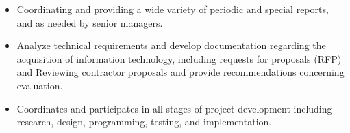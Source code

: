\documentclass[letterpaper]{twentysecondcv} %
\begin{document}
\begin{twenty}
{{\begin{itemize}
\vspace{1mm}
\item	Coordinating and providing a wide variety of periodic and special reports, and as needed by senior managers.
\vspace{1mm}
\item	Analyze technical requirements and develop documentation regarding the acquisition of information technology, including requests for proposals (RFP) and	Reviewing contractor proposals and provide recommendations concerning evaluation.
\vspace{1mm}
\item	Coordinates and participates in all stages of project development including research, design, programming, testing, and implementation.
\vspace{1mm}
    \end{itemize}}
        }
    \\
     \end{twenty}
\end{document}
